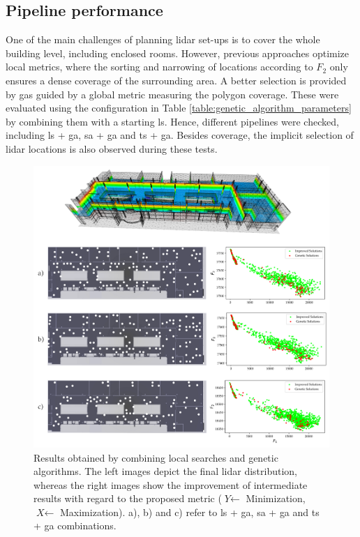 \subsection{Pipeline performance}

One of the main challenges of planning \acrshort{lidar} set-ups is to cover the whole building level, including enclosed rooms. However, previous approaches optimize local metrics, where the sorting and narrowing of locations according to $F_2$ only ensures a dense coverage of the surrounding area. A better selection is provided by \acrshort{ga}s guided by a global metric measuring the polygon coverage. These were evaluated using the configuration in Table \ref{table:genetic_algorithm_parameters} by combining them with a starting \acrshort{ls}. Hence, different pipelines were checked, including \acrshort{ls} + \acrshort{ga}, \acrshort{sa} + \acrshort{ga} and \acrshort{ts} + \acrshort{ga}. Besides coverage, the implicit selection of \acrshort{lidar} locations is also observed during these tests.

\begin{figure}[hb]
    \centering
    \includegraphics[width=.9\linewidth]{figs/lidar_optimization/ga_results.png}
	\caption{Results obtained by combining local searches and genetic algorithms. The left images depict the final \acrshort{lidar} distribution, whereas the right images show the improvement of intermediate results with regard to the proposed metric ($\textit{Y} \gets$ Minimization, $\textit{X} \gets$ Maximization). a), b) and c) refer to \acrshort{ls} + \acrshort{ga}, \acrshort{sa} + \acrshort{ga} and \acrshort{ts} + \acrshort{ga} combinations. }
	\label{fig:genetic_results}
\end{figure}

